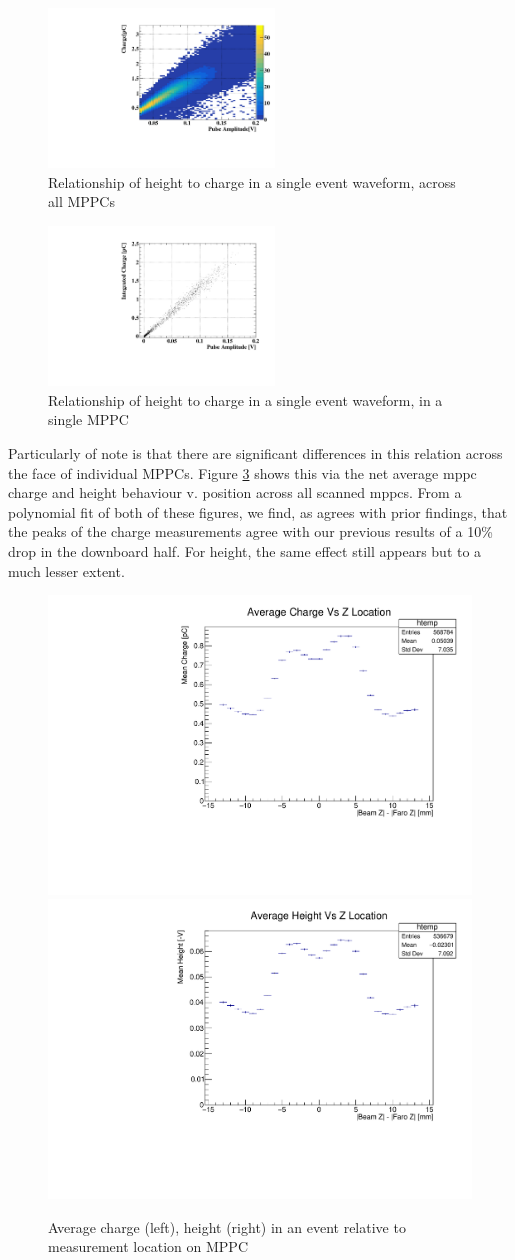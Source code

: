 \begin{figure}
    \centering
    \includegraphics[width=6cm]{graphics/qvampcolor.pdf}
    \caption{Relationship of height to charge in a single event waveform, across all MPPCs}
    \label{fig:qvsamp}
\end{figure}
\begin{figure}
    \centering
    \includegraphics[width=6cm]{graphics/qvampsingle.pdf}
    \caption{Relationship of height to charge in a single event waveform, in a single MPPC}
    \label{fig:qvsampsing}
\end{figure}

Particularly of note is that there are significant differences in this relation across the face of individual MPPCs.
Figure \ref{fig:heightvzplot} shows this via the net average mppc charge and height behaviour v. position across all scanned mppcs.
From a polynomial fit of both of these figures, we find, as agrees with prior findings, that the peaks of the charge measurements agree with our previous results of a 10\% drop in the downboard half. For height, the same effect still appears but to a much lesser extent.

\begin{figure}
\centering

\includegraphics[width=4 cm]{graphics/chargevsz.pdf}
\includegraphics[width=4 cm]{graphics/heightvsz.pdf}
\caption{Average charge (left), height (right) in an event relative to measurement location on MPPC}
\label{fig:heightvzplot}
\end{figure}

